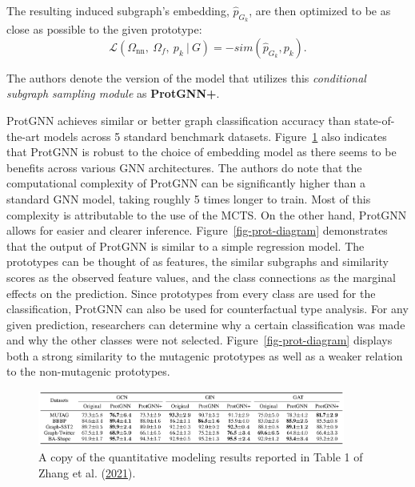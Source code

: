 \documentclass[
  11pt,
  letterpaper,
]{article}
\begin{document}
The resulting induced subgraph's embedding, \(\hat p_{G_k}\), are then
optimized to be as close as possible to the given prototype:
\begin{equation}
    \mathcal{L}(\Omega_{\text{nn}}, \ \Omega_f, \ p_k \ | \ G) = - sim(\hat p_{G_k}, p_k). 
\end{equation}

The authors denote the version of the model that utilizes this
\emph{conditional subgraph sampling module} as \textbf{ProtGNN+}.

\quad ProtGNN achieves similar or better graph classification accuracy
than state-of-the-art models across 5 standard benchmark datasets.
Figure~\ref{fig-prot-acc-table} also indicates that ProtGNN is robust to
the choice of embedding model as there seems to be benefits across
various GNN architectures. The authors do note that the computational
complexity of ProtGNN can be significantly higher than a standard GNN
model, taking roughly 5 times longer to train. Most of this complexity
is attributable to the use of the MCTS. On the other hand, ProtGNN
allows for easier and clearer inference. Figure~\ref{fig-prot-diagram}
demonstrates that the output of ProtGNN is similar to a simple
regression model. The prototypes can be thought of as features, the
similar subgraphs and similarity scores as the observed feature values,
and the class connections as the marginal effects on the prediction.
Since prototypes from every class are used for the classification,
ProtGNN can also be used for counterfactual type analysis. For any given
prediction, researchers can determine why a certain classification was
made and why the other classes were not selected.
Figure~\ref{fig-prot-diagram} displays both a strong similarity to the
mutagenic prototypes as well as a weaker relation to the non-mutagenic
prototypes.

\begin{figure}

{\centering \includegraphics[width=0.9\textwidth,height=\textheight]{figures/prot_acc_table.png}

}

\caption{\label{fig-prot-acc-table}A copy of the quantitative modeling
results reported in Table 1 of Zhang et al.
(\protect\hyperlink{ref-Zhang_Liu_Wang_Lu_Lee_2021}{2021}).}

\end{figure}
\end{document}
